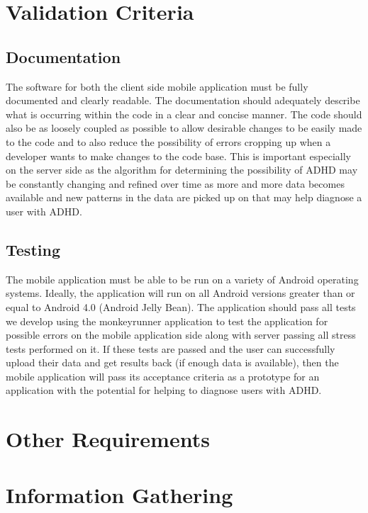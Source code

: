 \documentclass[a4wide]{article}
\begin{document}
\section{Validation Criteria}

\subsection{Documentation}
The software for both the client side mobile application must be fully
documented and clearly readable. The documentation should adequately describe
what is occurring within the code in a clear and concise manner. The code should
also be as loosely coupled as possible to allow desirable changes to be easily
made to the code and to also reduce the possibility of errors cropping up when
a developer wants to make changes to the code base. This is important especially
on the server side as the algorithm for determining the possibility of ADHD may
be constantly changing and refined over time as more and more data becomes
available and new patterns in the data are picked up on that may help diagnose a
user with ADHD.
\subsection{Testing}
The mobile application must be able to be run on a variety of Android operating
systems. Ideally, the application will run on all Android versions greater than
or equal to Android 4.0 (Android Jelly Bean). The application should pass all
tests we develop using the monkeyrunner application to test the application for
possible errors on the mobile application side along with server passing all
stress tests performed on it. If these tests are passed and the user can
successfully upload their data and get results back (if enough data is
available), then the mobile application will pass its acceptance criteria as a
prototype for an application with the potential for helping to diagnose users
with ADHD.




\section{Other Requirements}
\newpage
\appendix
\appendixpage

\section{Information Gathering}
\end{document}
